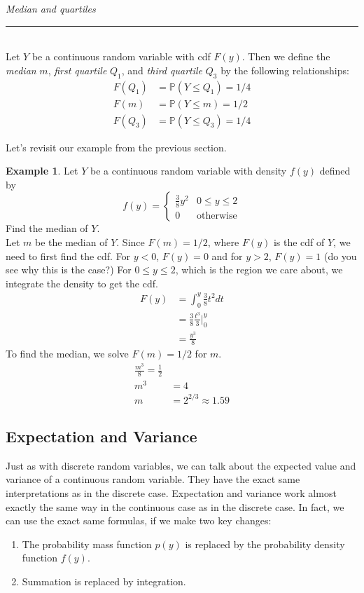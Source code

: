 \documentclass[12pt]{article}
\theoremstyle{definition}
\newtheorem*{example}{Example}
\theoremstyle{remark}
\def\P{{\mathbb P}}
\begin{document}
\begin{framed}
\emph{Median and quartiles}\\
  \rule{\dimexpr{}\fboxrule}{.1pt} \\
Let $Y$ be a continuous random variable with cdf $F(y)$. Then we define the \emph{median} $m$, \emph{first quartile} $Q_1$, and \emph{third quartile} $Q_3$ by the following relationships:
\begin{align*}
F(Q_1) &= \P(Y \leq Q_1) = 1/4\\
F(m) &= \P(Y \leq m) = 1/2\\
F(Q_3) &= \P(Y \leq Q_3) = 1/4
\end{align*}
\end{framed}

Let's revisit our example from the previous section.

\begin{example}
Let $Y$ be a continuous random variable with density $f(y)$ defined by
\[
f(y) = \begin{cases}
\frac{3}{8} y^2 & 0 \leq y\leq 2\\
0 & \text{otherwise}
\end{cases}
\]
Find the median of $Y$.\\

Let $m$ be the median of $Y$. Since $F(m) = 1/2$, where $F(y)$ is the cdf of $Y$, we need to first find the cdf. For $y < 0$, $F(y) = 0$ and for $y > 2$, $F(y) = 1$ (do you see why this is the case?) For $0 \leq y \leq 2$, which is the region we care about, we integrate the density to get the cdf.
\begin{align*}
F(y) &= \int_0^y \frac{3}{8} t^2 dt \\
&= \frac{3}{8} \frac{t^3}{3}\Bigr|_0^y \\
&= \frac{y^3}{8}
\end{align*}
To find the median, we solve $F(m) = 1/2$ for $m$.
\begin{align*}
\frac{m^3}{8} = \frac{1}{2} \\
m^3 &= 4 \\
m &= 2^{2/3} \approx 1.59
\end{align*}
\end{example}

\subsection{Expectation and Variance}
Just as with discrete random variables, we can talk about the expected value and variance of a continuous random variable. They have the exact same interpretations as in the discrete case. Expectation and variance work almost exactly the same way in the continuous case as in the discrete case. In fact, we can use the exact same formulas, if we make two key changes:
\begin{enumerate}
\item The probability mass function $p(y)$ is replaced by the probability density function $f(y)$.
\item Summation is replaced by integration.
\end{enumerate}
\end{document}
